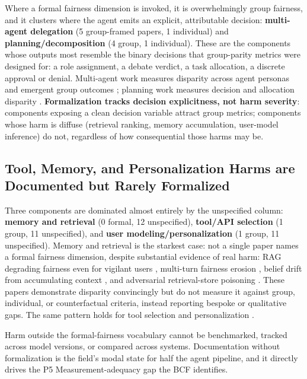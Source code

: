 \documentclass[acmsmall,nonacm]{acmart}
\begin{document}
Where a formal fairness dimension is invoked, it is overwhelmingly group fairness, and it clusters where the agent emits an explicit, attributable decision: \textbf{multi-agent delegation} (5 group-framed papers, 1 individual) and \textbf{planning/decomposition} (4 group, 1 individual). These are the components whose outputs most resemble the binary decisions that group-parity metrics were designed for: a role assignment, a debate verdict, a task allocation, a discrete approval or denial. Multi-agent work measures disparity across agent personas and emergent group outcomes \cite{madigan2025emergent,nguyen2025social,li2025from,mirza2025malibu}; planning work measures decision and allocation disparity \cite{li2025actions,hall2025guiding,parziale2026once}. \textbf{Formalization tracks decision explicitness, not harm severity}: components exposing a clean decision variable attract group metrics; components whose harm is diffuse (retrieval ranking, memory accumulation, user-model inference) do not, regardless of how consequential those harms may be.

\subsection{Tool, Memory, and Personalization Harms are Documented but Rarely Formalized}

Three components are dominated almost entirely by the unspecified column: \textbf{memory and retrieval} (0 formal, 12 unspecified), \textbf{tool/API selection} (1 group, 11 unspecified), and \textbf{user modeling/personalization} (1 group, 11 unspecified). Memory and retrieval is the starkest case: not a single paper names a formal fairness dimension, despite substantial evidence of real harm: RAG degrading fairness even for vigilant users \cite{hu2024free}, multi-turn fairness erosion \cite{fan2024fairmt}, belief drift from accumulating context \cite{geng2025accumulating,simhi2026old}, and adversarial retrieval-store poisoning \cite{wang2025bias}. These papers demonstrate disparity convincingly but do not measure it against group, individual, or counterfactual criteria, instead reporting bespoke or qualitative gaps. The same pattern holds for tool selection \cite{blankenstein2025biasbusters,sneh2025tooltweak} and personalization \cite{kantharuban2024stereotype,pawar2025presumed,mire2025rejected,tonneau2026different}.

Harm outside the formal-fairness vocabulary cannot be benchmarked, tracked across model versions, or compared across systems. Documentation without formalization is the field's modal state for half the agent pipeline, and it directly drives the P5 Measurement-adequacy gap the BCF identifies.
\end{document}

